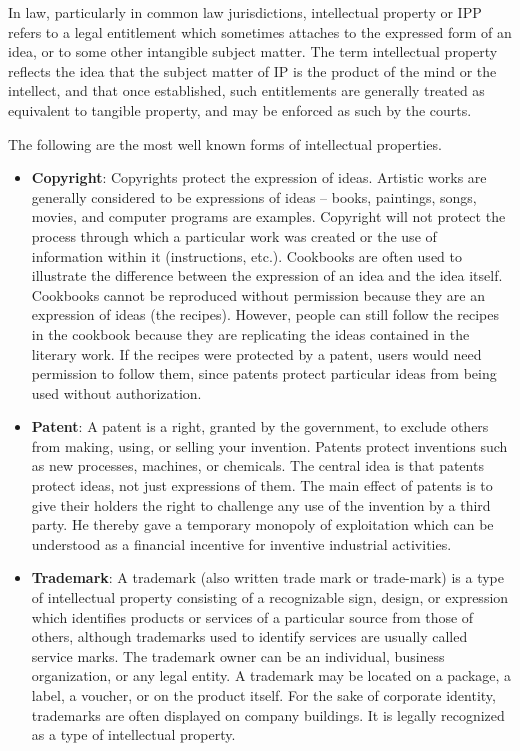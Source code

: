 \documentclass [12pt, a4paper]{article}
\begin{document}
In law, particularly in common law jurisdictions, intellectual property or IPP refers to a legal entitlement which sometimes attaches to the expressed form of an idea, or to some other intangible subject matter. The term intellectual property reflects the idea that the subject matter of IP is the product of the mind or the intellect, and that once established, such entitlements are generally treated as equivalent to tangible property, and may be enforced as such by the courts.

The following are the most well known forms of intellectual properties.

\begin{itemize}
	\item \textbf{Copyright}: Copyrights protect the expression of ideas. Artistic works are generally considered to be expressions of ideas – books, paintings, songs, movies, and computer programs are examples. Copyright will not protect the process through which a particular work was created or the use of information within it (instructions, etc.). Cookbooks are often used to illustrate the difference between the expression of an idea and the idea itself. Cookbooks cannot be reproduced without permission because they are an expression of ideas (the recipes). However, people can still follow the recipes in the cookbook because they are replicating the ideas contained in the literary work. If the recipes were protected by a patent, users would need permission to follow them, since patents protect particular ideas from being used without authorization.
	\item \textbf{Patent}: A patent is a right, granted by the government, to exclude others from making, using, or selling your invention. Patents protect inventions such as new processes, machines, or chemicals. The central idea is that patents protect ideas, not just expressions of them. The main effect of patents is to give their holders the right to challenge any use of the invention by a third party. He thereby gave a temporary monopoly of exploitation which can be understood as a financial incentive for inventive industrial activities.
	\item \textbf{Trademark}: A trademark (also written trade mark or trade-mark) is a type of intellectual property consisting of a recognizable sign, design, or expression which identifies products or services of a particular source from those of others, although trademarks used to identify services are usually called service marks. The trademark owner can be an individual, business organization, or any legal entity. A trademark may be located on a package, a label, a voucher, or on the product itself. For the sake of corporate identity, trademarks are often displayed on company buildings. It is legally recognized as a type of intellectual property.

\end{itemize}
\end{document}

